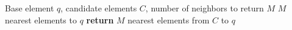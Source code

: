 \begin{algorithm}[H]
\caption{SELECT-NEIGHBORS-SIMPLE($q$, $C$, $M$)}\label{alg:nei_sim}
\begin{algorithmic}[1]
\Require Base element $q$, candidate elements $C$, number of neighbors to return $M$
\Ensure $M$ nearest elements to $q$
\State \textbf{return} $M$ nearest elements from $C$ to $q$
\end{algorithmic}
\end{algorithm}
